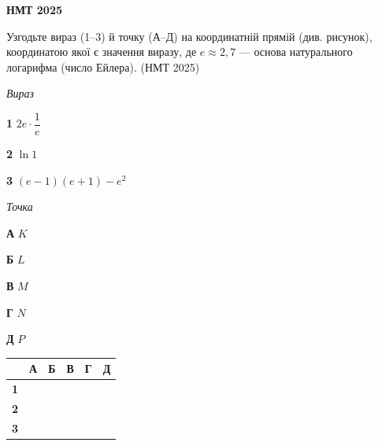 \documentclass[14pt]{extarticle}
\newcommand{\matchTable}{
\begin{tabular}{|>{\centering\arraybackslash}p{0.2cm}|*{5}{>{\centering\arraybackslash}p{0.2cm}|}}
\hline
& \textbf{А} & \textbf{Б} & \textbf{В} & \textbf{Г} & \textbf{Д} \\
\hline
\textbf{1} & \rule{0pt}{0.2cm} & & & & \\
\hline
\textbf{2} & \rule{0pt}{0.2cm} & & & & \\
\hline
\textbf{3} & \rule{0pt}{0.2cm} & & & & \\
\hline
\end{tabular}
}
\newcommand{\task}[2]{\noindent\makebox[1.5em][l]{\textbf{#1.}}\parbox[t]{\dimexpr\textwidth-1.5em}{#2}}
\newcommand{\nmtyear}[1]{\hfill{\small\color{yearcolor}(НМТ #1)}}
\begin{document}
\begin{center}
{\Large\textbf{\color{headerblue}НМТ 2025}}
\end{center}

\vspace{0.5cm}

\task{39}{Узгодьте вираз (1--3) й точку (А--Д) на координатній прямій (див. рисунок), координатою якої є значення виразу, де $e \approx 2{,}7$ --- основа натурального логарифма (число Ейлера). \nmtyear{2025}}

\vspace{0.3cm}
\begin{center}
\end{center}

\vspace{0.3cm}
\begin{minipage}{0.4\textwidth}
\textit{Вираз}

\vspace{0.2cm}
\textbf{1} \quad $2e \cdot \dfrac{1}{e}$

\vspace{0.3cm}
\textbf{2} \quad $\ln 1$

\vspace{0.2cm}
\textbf{3} \quad $(e - 1)(e + 1) - e^2$
\end{minipage}
\hfill
\begin{minipage}{0.35\textwidth}
\textit{Точка}

\vspace{0.2cm}
\textbf{А} \quad $K$

\vspace{0.2cm}
\textbf{Б} \quad $L$

\vspace{0.2cm}
\textbf{В} \quad $M$

\vspace{0.2cm}
\textbf{Г} \quad $N$

\vspace{0.2cm}
\textbf{Д} \quad $P$
\end{minipage}
\hfill
\begin{minipage}{0.15\textwidth}
\matchTable
\end{minipage}
\end{document}
